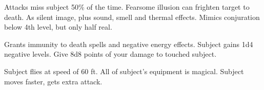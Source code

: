 \begin{swspelllist}
 Attacks miss subject 50\% of the time.
 Fearsome illusion can frighten target to death.
 As silent image, plus sound, smell and thermal effects.
 Mimics conjuration below 4th level, but only half real.

 Grants immunity to death spells and negative energy effects.
 Subject gains 1d4 negative levels.
 Give 8d8 points of your damage to touched subject.
\spellheadrestricted{}

 Subject flies at speed of 60 ft.
 All of subject's equipment is magical.
 Subject moves faster, gets extra attack.
\end{swspelllist}

